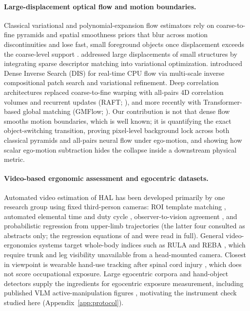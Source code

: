 \documentclass[11pt]{article}
\begin{document}
\paragraph{Large-displacement optical flow and motion boundaries.}
Classical variational and polynomial-expansion flow estimators rely on coarse-to-fine pyramids and
spatial smoothness priors that blur across motion discontinuities and lose fast, small foreground
objects once displacement exceeds the coarse-level support \citep{farneback2003,brox2011ldof}.
\citet{brox2011ldof} addressed large displacements of small structures by integrating sparse
descriptor matching into variational optimization. \citet{kroeger2016dis} introduced Dense Inverse
Search (DIS) for real-time CPU flow via multi-scale inverse compositional patch search and
variational refinement. Deep correlation architectures replaced coarse-to-fine warping with
all-pairs 4D correlation volumes and recurrent updates (RAFT; \citep{teed2020raft}), and more
recently with Transformer-based global matching (GMFlow; \citep{xu2022gmflow}). Our contribution
is not that dense flow smooths motion boundaries, which is well known; it is quantifying the exact
object-switching transition, proving pixel-level background lock across both classical pyramids and
all-pairs neural flow under ego-motion, and showing how scalar ego-motion subtraction hides the
collapse inside a downstream physical metric.

\paragraph{Video-based ergonomic assessment and egocentric datasets.}
Automated video estimation of HAL has been developed primarily by one research group using
fixed third-person cameras: ROI template matching \citep{chen2013}, automated elemental time and
duty cycle \citep{akkas2016}, observer-to-vision agreement \citep{radwin2023}, and probabilistic
regression from upper-limb trajectories \citep{lin2026hal} (the latter four consulted as abstracts
only; the regression equations of \citet{radwin2015} and \citet{akkas2015} were read in full). General
video-ergonomics systems target whole-body indices such as RULA and REBA
\citep{agostinelli2024,massiris2022ergoexplorer,yazdani2022dula}, which require trunk and leg
visibility unavailable from a head-mounted camera. Closest in viewpoint is wearable hand-use
tracking after spinal cord injury \citep{likitlersuang2019}, which does not score occupational
exposure. Large egocentric corpora \citep{grauman2022ego4d,damen2022epic100,buildai2025corpus}
and hand-object detectors \citep{shan2020hands,zhang2022egohos} supply the ingredients for
egocentric exposure measurement, including published VLM active-manipulation figures
\citep{buildai2025eval,theodoro2026vernier}, motivating the instrument check studied here
(Appendix~\ref{app:protocol}).
\end{document}
